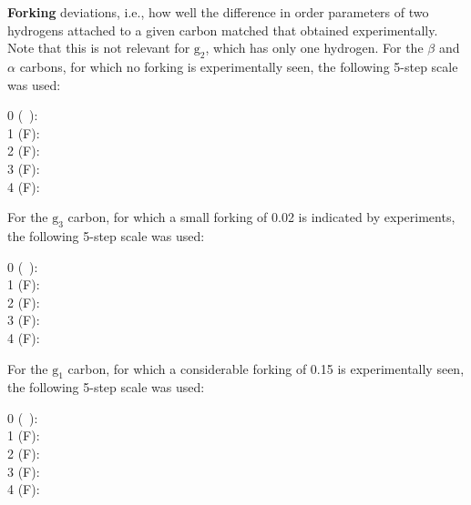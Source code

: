 \documentclass[journal=jacsat,manuscript=article]{achemso}
\begin{document}
{\bf Forking} deviations, i.e., how well the difference in order parameters of two hydrogens attached to a given carbon matched that obtained experimentally. Note that this is not relevant for $\mathrm{g_2}$, which has only one hydrogen. For the $\beta$ and $\alpha$ carbons, for which no forking is experimentally seen, the following 5-step scale was used:
\begin{description}
\item [0 (~):] 
%
\item [1 ({\textsf{\tiny F}}):] 
%
\item [2  ({\textsf{\small F}}):] 
%
\item [3 ({\textsf{\large F}}):] 
%
\item [4 ({\textsf{\Large F}}):] 
\end{description}
%
For the $\mathrm{g_3}$ carbon, for which a small forking of 0.02 is indicated by experiments, the following 5-step scale was used:
%
\begin{description}
\item [0 (~):] 
%
\item [1 ({\textsf{\tiny F}}):] 
%
\item [2  ({\textsf{\small F}}):] 
%
\item [3 ({\textsf{\large F}}):] 
%
\item [4 ({\textsf{\Large F}}):] 
\end{description}
%
For the $\mathrm{g_1}$ carbon, for which a considerable forking of 0.15 is experimentally seen, the following 5-step scale was used:
%
\begin{description}
\item [0 (~):] 
%
\item [1 ({\textsf{\tiny F}}):] 
%
\item [2  ({\textsf{\small F}}):] 
%
\item [3 ({\textsf{\large F}}):] 
%
\item [4 ({\textsf{\Large F}}):] 
\end{description}
\end{document}
